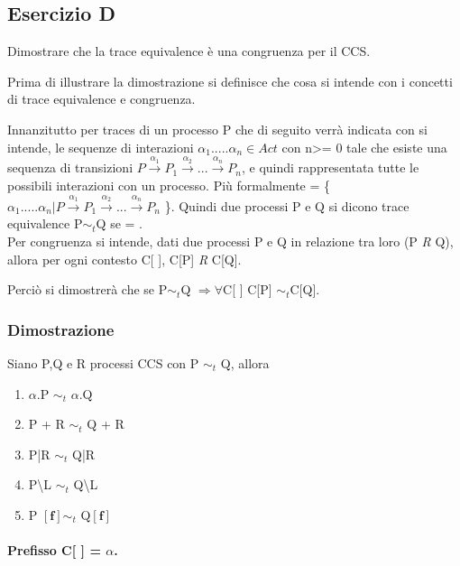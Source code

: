 \pagebreak
\subsection{Esercizio D} 
Dimostrare che la trace equivalence è una congruenza per il CCS.

Prima di illustrare la dimostrazione si definisce che cosa si intende con i concetti di trace equivalence e congruenza.

Innanzitutto per traces di un processo P che di seguito verrà indicata con  si intende, le sequenze di interazioni $\alpha_{1}.....\alpha_{n} \in Act$ con n>= 0 tale che esiste una sequenza di transizioni $P \overset{\alpha_{1}}\rightarrow P_{1} \overset{\alpha_{2}}\rightarrow...\overset{\alpha_{n}}\rightarrow P_{n}$, e quindi rappresentata tutte le possibili interazioni con un processo. Più formalmente  = \{ $\alpha_{1}.....\alpha_{n} | P \overset{\alpha_{1}}\rightarrow P_{1} \overset{\alpha_{2}}\rightarrow...\overset{\alpha_{n}}\rightarrow P_{n}$ \}. Quindi due processi P e Q si dicono trace equivalence P$\sim_{t}$Q se  = .
\\

Per congruenza si intende, dati due processi P e Q in relazione tra loro (P \textit{R} Q), allora per ogni contesto C[ ], C[P] \textit{R} C[Q]. 

Perciò si dimostrerà che se P$\sim_{t}$Q $\Rightarrow \forall$C[ ] C[P] $\sim_{t}$C[Q].

\subsubsection{Dimostrazione} 

Siano P,Q e R processi CCS con P $\sim_{t}$ Q, allora 

\begin{enumerate}
	\item $\alpha$.P $\sim_{t}$ $\alpha$.Q
	\item P + R $\sim_{t}$ Q + R
	\item P|R $\sim_{t}$ Q|R
	\item P\textbackslash L $\sim_{t}$ Q\textbackslash L
	\item P $\mathbf{[f]}\sim_{t}$ Q$\mathbf{[f]}$
\end{enumerate}

\paragraph{Prefisso C[ ] = $\alpha$.} \mbox{}


